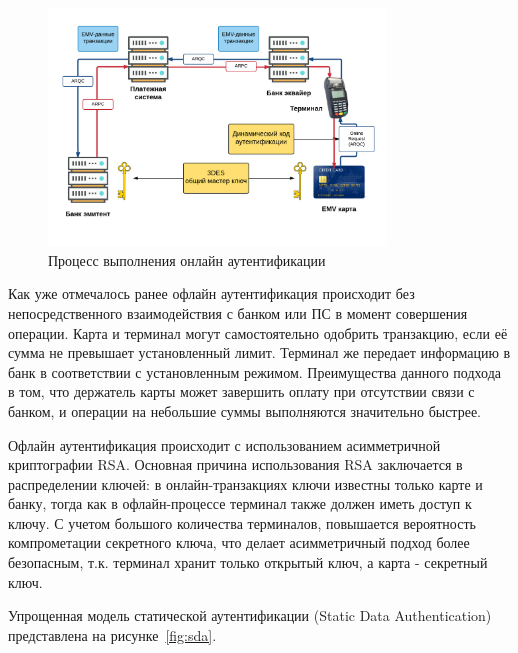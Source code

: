 \begin{figure}[H]
    \centering
    \includegraphics[width=0.8\textwidth]{images/research/online_auth}
    \caption{\centering Процесс выполнения онлайн аутентификации}
    \label{fig:online_auth}
\end{figure}



Как уже отмечалось ранее офлайн аутентификация происходит без непосредственного взаимодействия с банком или ПС в момент совершения операции.
Карта и терминал могут самостоятельно одобрить транзакцию, если её сумма не превышает установленный лимит.
Терминал же передает информацию в банк в соответствии с установленным режимом.
Преимущества данного подхода в том, что держатель карты может завершить оплату при отсутствии связи с банком, и операции на небольшие суммы выполняются значительно быстрее.

Офлайн аутентификация происходит с использованием асимметричной криптографии RSA.
Основная причина использования RSA заключается в распределении ключей: в онлайн-транзакциях ключи известны только карте и банку, тогда как в офлайн-процессе терминал также должен иметь доступ к ключу.
С учетом большого количества терминалов, повышается вероятность компрометации секретного ключа, что делает асимметричный подход более безопасным, т.к. терминал хранит только открытый ключ, а карта - секретный ключ.

Упрощенная модель статической аутентификации (Static Data Authentication) представлена на рисунке~\ref{fig:sda}.

